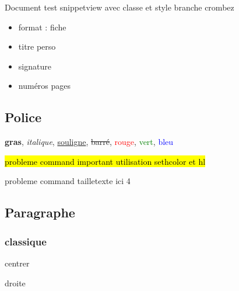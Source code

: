 \documentclass[fiche]{classe-tex3R}
\begin{document}

\iffiche{}\fi

\iffiche\cfoot{\pagemark}\fi

Document test snippetview
avec classe et style branche crombez
 
\begin{itemize}
    \item format : fiche
    \item titre perso
    \item signature
    \item numéros pages
\end{itemize}

\mdseries

\subsection{Police}
\textbf{gras}, \textit{italique}, \underline{souligne}, \st{barré}, \textcolor{Red}{rouge}, \textcolor{Green}{vert}, \textcolor{Blue}{bleu}

\hl{probleme command important utilisation sethcolor et hl}

{ probleme command tailletexte ici 4}

\subsection{Paragraphe}

\subsubsection{classique}

\begin{center}
    centrer
\end{center}

\begin{flushright}
    droite
\end{flushright}


\hfill%
%
\end{document}
